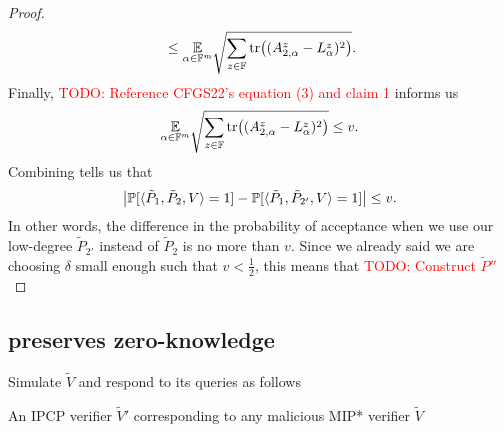 \documentclass[english,12pt]{reedthesis}
\theoremstyle{plain}
\theoremstyle{definition}
\theoremstyle{remark}
\DeclareMathOperator{\tr}{tr}
\DeclarePairedDelimiter{\abs}{\lvert}{\rvert}
\DeclarePairedDelimiter{\ang}{\langle}{\rangle}
\newcommand{\TODO}[1]{\textcolor{red}{TODO: #1}}
\begin{document}
\begin{proof}
\begin{equation}
{    } \le
    \underset{\alpha \in \mathbb{F}^{m}}{\mathbb{E}}\sqrt{
      \sum_{z \in \mathbb{F}}\tr\mleft((A_{2,\alpha}^{z} - L_{\alpha}^{z})^{2}\mright)
    }.
  \end{equation}
  Finally, \TODO{Reference CFGS22's equation (3) and claim 1} informs us
  \begin{equation}\label{eqn:less-than-v}
    \underset{\alpha \in \mathbb{F}^{m}}{\mathbb{E}}\sqrt{
      \sum_{z \in \mathbb{F}}\tr\mleft((A_{2,\alpha}^{z} - L_{\alpha}^{z})^{2}\mright)
    } \le v.
  \end{equation}
  Combining  tells us that
  \begin{equation}
    \abs*{\mathbb{P}[\ang{\tilde{P}_{1}, \tilde{P}_{2}, V} = 1] - \mathbb{P}[\ang{\tilde{P}_{1}, \tilde{P}_{2'}, V} = 1]} \le v.
  \end{equation}
  In other words, the difference in the probability of acceptance when we use
  our low-degree $\tilde{P}_{2'}$ instead of $\tilde{P}_{2}$ is no more than
  $v$. Since we already said we are choosing $\delta$ small enough such that
  $v < \frac{1}{2}$, this means that \TODO{Construct $\tilde{P}''$}
\end{proof}

\subsection{ preserves
  zero-knowledge}\label{sec:mip-ipcp-pzk}

\begin{algorithm}[htbp]
  Simulate $\tilde{V}$ and respond to its queries as follows\;
  \Else{
    \Reject\;
  }
  \;
  \caption{An IPCP verifier $\tilde{V}'$ corresponding to any malicious MIP*
    verifier $\tilde{V}$~\cite[]{CFGS22}}\label{alg:ipcp-corresp-ver}
\end{algorithm}
\end{document}
